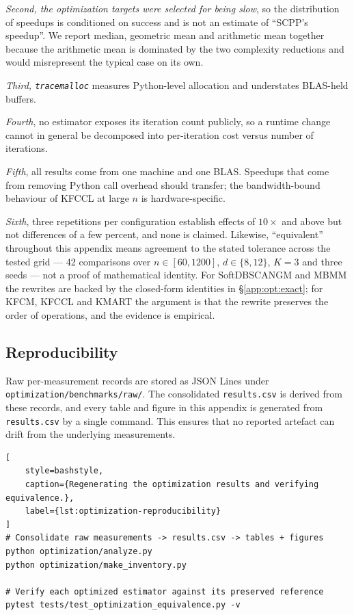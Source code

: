 \documentclass[twoside,11pt]{article}
\begin{document}
\emph{Second, the optimization targets were selected for being slow}, so the
distribution of speedups is conditioned on success and is not an estimate of
``SCPP's speedup''. We report median, geometric mean and arithmetic mean
together because the arithmetic mean is dominated by the two complexity
reductions and would misrepresent the typical case on its own.

\emph{Third, \texttt{tracemalloc}} measures Python-level allocation and
understates BLAS-held buffers.

\emph{Fourth}, no estimator exposes its iteration count publicly, so a
runtime change cannot in general be decomposed into per-iteration cost versus
number of iterations.

\emph{Fifth}, all results come from one machine and one BLAS. Speedups that
come from removing Python call overhead should transfer; the
bandwidth-bound behaviour of KFCCL at large $n$ is hardware-specific.

\emph{Sixth}, three repetitions per configuration establish effects of
$10\times$ and above but not differences of a few percent, and none is
claimed. Likewise, ``equivalent'' throughout this appendix means agreement to
the stated tolerance across the tested grid --- 42 comparisons over $n \in
[60, 1200]$, $d \in \{8, 12\}$, $K = 3$ and three seeds --- not a proof of
mathematical identity. For SoftDBSCANGM and MBMM the rewrites are backed by
the closed-form identities in \S\ref{app:opt:exact}; for KFCM, KFCCL and
KMART the argument is that the rewrite preserves the order of operations, and
the evidence is empirical.

\subsection{Reproducibility}

Raw per-measurement records are stored as JSON Lines under
\texttt{optimization/benchmarks/raw/}. The consolidated
\texttt{results.csv} is derived from these records, and every table and
figure in this appendix is generated from \texttt{results.csv} by a single
command. This ensures that no reported artefact can drift from the
underlying measurements.

\begin{lstlisting}[
    style=bashstyle,
    caption={Regenerating the optimization results and verifying equivalence.},
    label={lst:optimization-reproducibility}
]
# Consolidate raw measurements -> results.csv -> tables + figures
python optimization/analyze.py
python optimization/make_inventory.py

# Verify each optimized estimator against its preserved reference
pytest tests/test_optimization_equivalence.py -v
\end{lstlisting}
\end{document}
